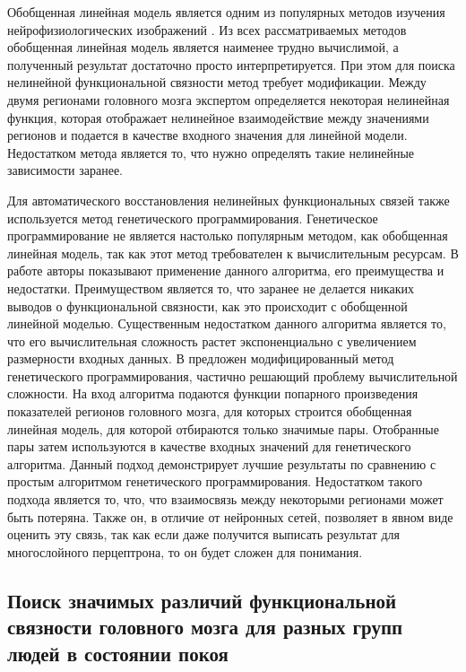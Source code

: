 Обобщенная линейная модель является одним из популярных методов изучения нейрофизиологических изображений 
\cite{lahaye2003functional, karanikolas2016multi}. Из всех рассматриваемых методов обобщенная линейная 
модель является наименее трудно вычислимой, а полученный результат достаточно просто интерпретируется. 
При этом для поиска нелинейной функциональной связности метод требует модификации. Между двумя регионами 
головного мозга экспертом определяется некоторая нелинейная функция, которая отображает нелинейное 
взаимодействие между значениями регионов и подается в качестве входного значения для линейной модели. 
Недостатком метода является то, что нужно определять такие нелинейные зависимости заранее.

Для автоматического восстановления нелинейных функциональных связей также используется метод генетического 
программирования. Генетическое программирование не является настолько популярным методом, как обобщенная 
линейная модель, так как этот метод требователен к вычислительным ресурсам. В работе \cite{allgaier2015nonlinear} 
авторы показывают применение данного алгоритма, его преимущества и недостатки. Преимуществом является то, что 
заранее не делается никаких выводов о функциональной связности, как это происходит с обобщенной линейной моделью. 
Существенным недостатком данного алгоритма является то, что его вычислительная сложность растет экспоненциально с 
увеличением размерности входных данных. В \cite{Icke2014} предложен модифицированный метод генетического 
программирования, частично решающий проблему вычислительной сложности. На вход алгоритма подаются функции 
попарного произведения показателей регионов головного мозга, для которых строится обобщенная линейная модель, 
для которой отбираются только значимые пары. Отобранные пары затем используются в качестве входных значений 
для генетического алгоритма. Данный подход демонстрирует лучшие результаты по сравнению с простым алгоритмом 
генетического программирования. Недостатком такого подхода является то, что, что взаимосвязь между некоторыми 
регионами может быть потеряна. Также он, в отличие от нейронных сетей, позволяет в явном виде оценить 
эту связь, так как если даже получится выписать результат для многослойного перцептрона, 
то он будет сложен для понимания.


\subsection{Поиск значимых различий  функциональной связности головного мозга для разных групп людей в состоянии покоя}


